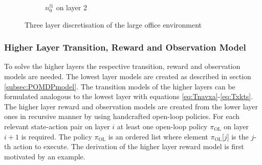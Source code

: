 \begin{figure}
\begin{subfigure}[b]{0.23\textwidth}
        \caption{$n_0^{l1}$ on layer 2}
        \label{subfig:bigenvl2}
    \end{subfigure}
    \caption{Three layer discretisation of the large office environment}
    \label{fig:bigenv_3layers}
\end{figure}






\subsubsection{Higher Layer Transition, Reward and Observation Model}
To solve the higher layers the respective transition, reward and observation models are needed. The lowest layer models are created as described in section \ref{subsec:POMDPmodel}. The transition models of the higher layers can be formulated analogous to the lowest layer with equations \ref{eq:Tnavxa}-\ref{eq:Txkts}. 
The higher layer reward and observation models are created from the lower layer ones in recursive manner by using handcrafted open-loop policies. For each relevant state-action pair on layer $i$ at least one open-loop policy $\pi_\text{OL}$ on layer $i+1$ is required. The policy $\pi_\text{OL}$ is an ordered list where element $\pi_\text{OL}\texttt{[$j$]}$ is the $j$-th action to execute. The derivation of the higher layer reward model is first motivated by an example.
